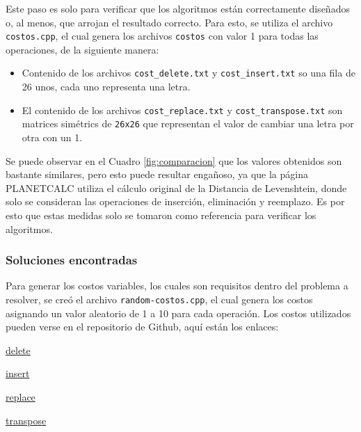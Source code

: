 Este paso es solo para verificar que los algoritmos están correctamente diseñados o, al menos, que arrojan el resultado correcto. Para esto, se utiliza el archivo \texttt{costos.cpp}, el cual genera los archivos \texttt{costos} con valor 1 para todas las operaciones, de la siguiente manera:

\begin{itemize}
   \item Contenido de los archivos \texttt{cost\_delete.txt} y \texttt{cost\_insert.txt} so una fila de 26 unos, cada uno representa una letra.
   \item El contenido de los archivos \texttt{cost\_replace.txt} y \texttt{cost\_transpose.txt} son matrices simétrics de \texttt{26x26} que representan el valor de cambiar una letra por otra con un 1. 
\end{itemize}

Se puede observar en el Cuadro \ref{fig:comparacion} que los valores obtenidos son bastante similares, pero esto puede resultar engañoso, ya que la página PLANETCALC utiliza el cálculo original de la Distancia de Levenshtein, donde solo se consideran las operaciones de inserción, eliminación y reemplazo. Es por esto que estas medidas solo se tomaron como referencia para verificar los algoritmos.

\subsubsection{Soluciones encontradas}
Para generar los costos variables, los cuales son requisitos dentro del problema a resolver, se creó el archivo \texttt{random-costos.cpp}, el cual genera los costos asignando un valor aleatorio de 1 a 10 para cada operación. Los costos utilizados pueden verse en el repositorio de Github, aquí están los enlaces:

\begin{itemize}
    \begin{minipage}{0.5\textwidth}
        \item \href{https://github.com/luphin/Tarea2y3Algoritmos-FB-PD/blob/main/codigos/cost_delete.txt}{delete}
        \item \href{https://github.com/luphin/Tarea2y3Algoritmos-FB-PD/blob/main/codigos/cost_insert.txt}{insert}
    \end{minipage}%
    \begin{minipage}{0.5\textwidth}
        \item \href{https://github.com/luphin/Tarea2y3Algoritmos-FB-PD/blob/main/codigos/cost_replace.txt}{replace}
        \item \href{https://github.com/luphin/Tarea2y3Algoritmos-FB-PD/blob/main/codigos/cost_transpose.txt}{transpose}
    \end{minipage}
\end{itemize}


